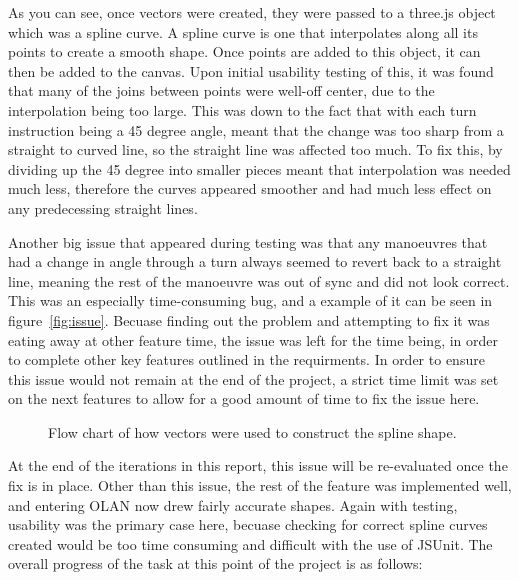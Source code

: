 As you can see, once vectors were created, they were passed to a three.js object which was a spline curve. A spline curve is one that interpolates along all its points to create a smooth shape. Once points are added to this object, it can then be added to the canvas. Upon initial usability testing of this, it was found that many of the joins between points were well-off center, due to the interpolation being too large. This was down to the fact that with each turn instruction being a 45 degree angle, meant that the change was too sharp from a straight to curved line, so the straight line was affected too much. To fix this, by dividing up the 45 degree into smaller pieces meant that interpolation was needed much less, therefore the curves appeared smoother and had much less effect on any predecessing straight lines.

Another big issue that appeared during testing was that any manoeuvres that had a change in angle through a turn always seemed to revert back to a straight line, meaning the rest of the manoeuvre was out of sync and did not look correct. This was an especially time-consuming bug, and a example of it can be seen in figure~\ref{fig:issue}. Becuase finding out the problem and attempting to fix it was eating away at other feature time, the issue was left for the time being, in order to complete other key features outlined in the requirments. In order to ensure this issue would not remain at the end of the project, a strict time limit was set on the next features to allow for a good amount of time to fix the issue here.

\begin{figure}[h]
  \centering
  \caption{Flow chart of how vectors were used to construct the spline shape.}
  \label{fig:vectors}
\end{figure}

At the end of the iterations in this report, this issue will be re-evaluated once the fix is in place. Other than this issue, the rest of the feature was implemented well, and entering OLAN now drew fairly accurate shapes. Again with testing, usability was the primary case here, becuase checking for correct spline curves created would be too time consuming and difficult with the use of JSUnit. The overall progress of the task at this point of the project is as follows:

